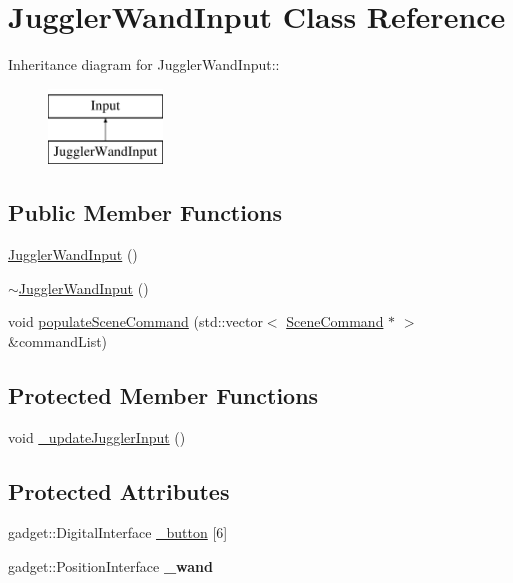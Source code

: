\hypertarget{class_juggler_wand_input}{
\section{JugglerWandInput Class Reference}
\label{class_juggler_wand_input}
}
Inheritance diagram for JugglerWandInput::\begin{figure}[H]
\begin{center}
\leavevmode
\includegraphics[height=2cm]{class_juggler_wand_input}
\end{center}
\end{figure}
\subsection*{Public Member Functions}
\begin{DoxyCompactItemize}
\item 
\hyperlink{class_juggler_wand_input_a54955ec4b9b37ac6abee74d03632c90e}{JugglerWandInput} ()
\item 
\hyperlink{class_juggler_wand_input_ad43caebd3f105e42091d2822e3ccfd3b}{$\sim$JugglerWandInput} ()
\item 
void \hyperlink{class_juggler_wand_input_a189d0680740c8755abc38b841de34130}{populateSceneCommand} (std::vector$<$ \hyperlink{class_scene_command}{SceneCommand} $\ast$ $>$ \&commandList)
\end{DoxyCompactItemize}
\subsection*{Protected Member Functions}
\begin{DoxyCompactItemize}
\item 
void \hyperlink{class_juggler_wand_input_af3e82f8e0484d2264676cdaafee04f32}{\_\-updateJugglerInput} ()
\end{DoxyCompactItemize}
\subsection*{Protected Attributes}
\begin{DoxyCompactItemize}
\item 
gadget::DigitalInterface \hyperlink{class_juggler_wand_input_abab4f0c7699fccd0d52b3d337a509cf9}{\_\-button} \mbox{[}6\mbox{]}
\item 
\hypertarget{class_juggler_wand_input_a2ebf622a2d77d696f8af4a9690fd525e}{
gadget::PositionInterface {\bfseries \_\-wand}}
\label{class_juggler_wand_input_a2ebf622a2d77d696f8af4a9690fd525e}

\end{DoxyCompactItemize}


